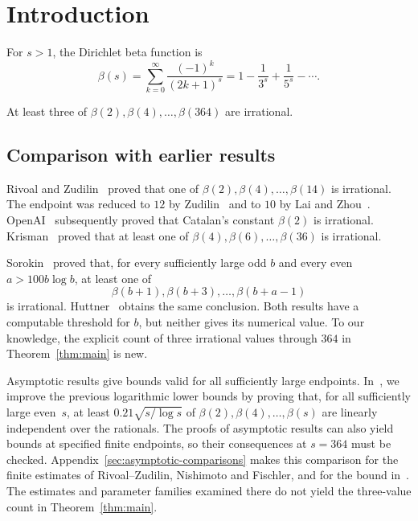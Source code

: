 \section{Introduction}

For $s>1$, the Dirichlet beta function is
\[
 \beta(s)=\sum_{k=0}^{\infty}\frac{(-1)^k}{(2k+1)^s}
         =1-\frac1{3^s}+\frac1{5^s}-\cdots.
\]
\begin{theorem}\label{thm:main}
At least three of $\beta(2),\beta(4),\ldots,\beta(364)$ are irrational.
\end{theorem}

\subsection{Comparison with earlier results}

Rivoal and Zudilin~\cite{RZ03} proved that one of
$\beta(2),\beta(4),\ldots,\beta(14)$ is irrational. The endpoint was reduced
to $12$ by Zudilin~\cite{Z19} and to $10$ by Lai and Zhou~\cite{LZ22}.
OpenAI~\cite[Theorem~1.1]{OAI26} subsequently proved that Catalan's
constant $\beta(2)$ is irrational. Krisman~\cite{K26} proved that at
least one of $\beta(4),\beta(6),\ldots,\beta(36)$ is irrational.

Sorokin~\cite[Theorem~S]{S07} proved that, for every sufficiently large
odd $b$ and every even $a>100b\log b$, at least one of
\[
 \beta(b+1),\beta(b+3),\ldots,\beta(b+a-1)
\]
is irrational. Huttner~\cite[Remark~5]{H12} obtains the same conclusion.
Both results have a computable threshold for $b$, but neither gives
its numerical value. To our knowledge, the explicit count of three
irrational values through $364$ in Theorem~\ref{thm:main} is new.

Asymptotic results give bounds valid for all sufficiently large
endpoints. In~\cite{T26}, we improve the previous
logarithmic lower bounds by proving that, for all sufficiently large
even~$s$, at least $0.21\sqrt{s/\log s}$ of
$\beta(2),\beta(4),\ldots,\beta(s)$ are linearly independent over the rationals.
The proofs of asymptotic results can also yield bounds at specified finite
endpoints, so their consequences at $s=364$ must be checked.
Appendix~\ref{sec:asymptotic-comparisons} makes this comparison for the
finite estimates of Rivoal--Zudilin, Nishimoto and Fischler, and for
the bound in~\cite{T26}. The estimates and parameter families examined
there do not yield the three-value count in Theorem~\ref{thm:main}.

